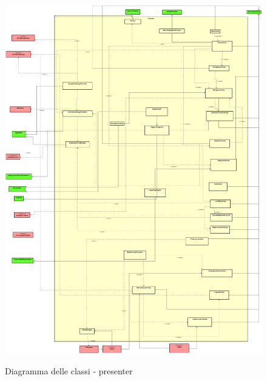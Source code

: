 \documentclass[../DefinizioneDiProdotto.tex]{subfiles}
\begin{document}
\begin{figure}[H]
	\includegraphics[width=\textwidth]{diagrams/ModelCompleteNoMethods/PNGpackage/presenter}
	\label{presenterPackage}
	\caption{Diagramma delle classi - presenter}
\end{figure}
\end{document}
